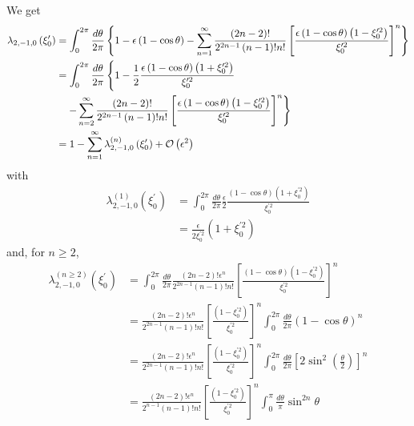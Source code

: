 We get
\begin{align}
\lambda_{2,-1,0}\left( \xi_{0}^{\prime}\right) & =\int_{0}^{2\pi}\frac{%
d\theta}{2\pi}\left\{ 1-\epsilon\left( 1-\cos\theta\right)
-\sum_{n=1}^{\infty}\frac{\left( 2n-2\right) !}{2^{2n-1}\left( n-1\right) !n!%
}\left[ \frac{\epsilon\left( 1-\cos\theta\right) \left( 1-\xi
_{0}^{\prime2}\right) }{\xi_{0}^{\prime2}}\right] ^{n}\right\} \\
& =\int_{0}^{2\pi}\frac{d\theta}{2\pi}\left\{ 1-\frac{1}{2}\frac
{\epsilon\left( 1-\cos\theta\right) \left( 1+\xi_{0}^{\prime2}\right)
}{\xi_{0}^{\prime2}}\right.\nonumber\\&\quad\left.-\sum_{n=2}^{\infty}\frac{\left( 2n-2\right) !}{%
2^{2n-1}\left( n-1\right) !n!}\left[ \frac{\epsilon\left( 1-\cos
\theta\right) \left( 1-\xi_{0}^{\prime2}\right) }{\xi_{0}^{\prime2}}\right]
^{n}\right\} \\
& =1-\sum_{n=1}^{\infty}\lambda_{2,-1,0}^{(n)}\left( \xi_{0}^{\prime
}\right) +\mathcal{O}\left( \epsilon^{2}\right)
\end{align}
with
\begin{align}
\lambda_{2,-1,0}^{(1)}\left( \xi_{0}^{\prime}\right) & =\int_{0}^{2\pi }%
\frac{d\theta}{2\pi}\frac{\epsilon}{2}\frac{\left( 1-\cos\theta\right)
\left( 1+\xi_{0}^{\prime2}\right) }{\xi_{0}^{\prime2}} \\
& =\frac{\epsilon}{2\xi_{0}^{\prime2}}\left( 1+\xi_{0}^{\prime2}\right)
\end{align}
and, for $n\geq2$,
\begin{align}
\lambda_{2,-1,0}^{(n\geq2)}\left( \xi_{0}^{\prime}\right) & =\int _{0}^{2\pi}%
\frac{d\theta}{2\pi}\frac{\left( 2n-2\right) !\epsilon^{n}}{2^{2n-1}\left(
n-1\right) !n!}\left[ \frac{\left( 1-\cos\theta\right) \left(
1-\xi_{0}^{\prime2}\right) }{\xi_{0}^{\prime2}}\right] ^{n} \\
& =\frac{\left( 2n-2\right) !\epsilon^{n}}{2^{2n-1}\left( n-1\right) !n!}%
\left[ \frac{\left( 1-\xi_{0}^{\prime2}\right) }{\xi_{0}^{\prime2}}\right]
^{n}\int_{0}^{2\pi}\frac{d\theta}{2\pi}\left( 1-\cos\theta\right) ^{n} \\
& =\frac{\left( 2n-2\right) !\epsilon^{n}}{2^{2n-1}\left( n-1\right) !n!}%
\left[ \frac{\left( 1-\xi_{0}^{\prime2}\right) }{\xi_{0}^{\prime2}}\right]
^{n}\int_{0}^{2\pi}\frac{d\theta}{2\pi}\left[ 2\sin^{2}\left( \frac{\theta}{2%
}\right) \right] ^{n} \\
& =\frac{\left( 2n-2\right) !\epsilon^{n}}{2^{n-1}\left( n-1\right) !n!}%
\left[ \frac{\left( 1-\xi_{0}^{\prime2}\right) }{\xi_{0}^{\prime2}}\right]
^{n}\int_{0}^{\pi}\frac{d\theta}{\pi}\sin^{2n}\theta
\end{align}

